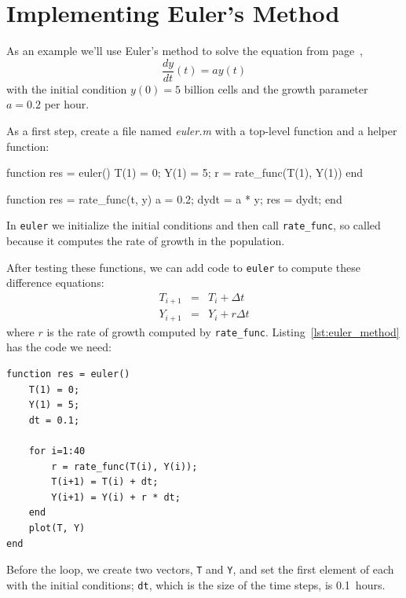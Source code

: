 

\section{Implementing Euler's Method}

As an example we'll use Euler's method to solve the equation from page~\pageref{diffeq},
\[ \frac{dy}{dt}(t) = a y(t) \]
with the initial condition $y(0) = 5$ billion cells and
the growth parameter $a = 0.2$ per hour. 


As a first step, create a file named \emph{euler.m} with a top-level function and a helper function:

\begin{code}
function res = euler()
    T(1) = 0;
    Y(1) = 5;
    r = rate_func(T(1), Y(1))
end

function res = rate_func(t, y)
   a = 0.2;
   dydt = a * y;
   res = dydt;
end
\end{code}

In \lstinline{euler} we initialize the initial conditions and then call \lstinline{rate_func}, so called because it computes the rate of growth in the population.


After testing these functions, we can add code to \lstinline{euler} to compute these difference equations:
\begin{eqnarray*}
T_{i+1} &=& T_i + \Delta t             \\
Y_{i+1} &=& Y_i + r \Delta t          
\end{eqnarray*}
%
where $r$ is the rate of growth computed by \lstinline{rate_func}.
Listing~\ref{lst:euler_method} has the code we need:

\begin{lstlisting}[caption={A function implementing Euler's method}, label={lst:euler_method}]
function res = euler()
    T(1) = 0;
    Y(1) = 5;
    dt = 0.1;
    
    for i=1:40
        r = rate_func(T(i), Y(i));
        T(i+1) = T(i) + dt;
        Y(i+1) = Y(i) + r * dt;
    end
    plot(T, Y)
end
\end{lstlisting}

Before the loop, we create two vectors, \lstinline{T} and \lstinline{Y}, and set the first element of each with the initial conditions;  \lstinline{dt}, which is the size of the time steps, is 0.1~hours.

